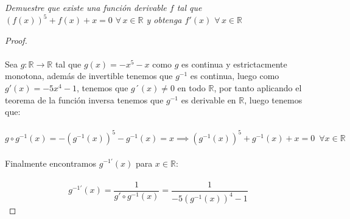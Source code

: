 \documentclass[11pt,letterpaper]{article}
\newcommand{\R}{\mathbb{R}}
\begin{document}
\newpage
\begin{tcolorbox}[
	title = \textcolor{black}{\textcolor{white}{Problema 5}},]
\textit{Demuestre que existe una funci\'on derivable $f$ tal que $(f(x))^5+f(x)+x=0$ $\forall\,x\in \R$ y obtenga
$f'(x)$ $\forall\,x\in \R$
}
\end{tcolorbox}
\begin{proof}\,\\
    \,\\
    Sea $g:\R\rightarrow \R$ tal que $g(x)=-x^5-x$ como $g$ es continua y
    estrictacmente monotona, adem\'as de invertible tenemos que $g^{-1}$ es continua, luego como $g'(x)=-5x^4-1$, tenemos que $g´(x)\neq 0$ en todo $\R$,
    por tanto aplicando el teorema de la funci\'on inversa tenemos que $g^{-1}$ es derivable en $\R$, luego tenemos que:\,\\
    \,\\
    \begin{equation*}
        g\circ g^{-1}(x)=-(g^{-1}(x))^5-g^{-1}(x)=x\implies (g^{-1}(x))^5+g^{-1}(x)+x=0\,\,\,\forall x\in \R
    \end{equation*}\,\\
    Finalmente encontramos $g^{-1'}(x)$ para $x\in \R$:\,\\
    \,\\
    \begin{equation*}
        g^{-1'}(x)=\frac{1}{g'\circ g^{-1}(x)}=\frac{1}{-5(g^{-1}(x))^4-1}
    \end{equation*}
\end{proof}
\end{document}
